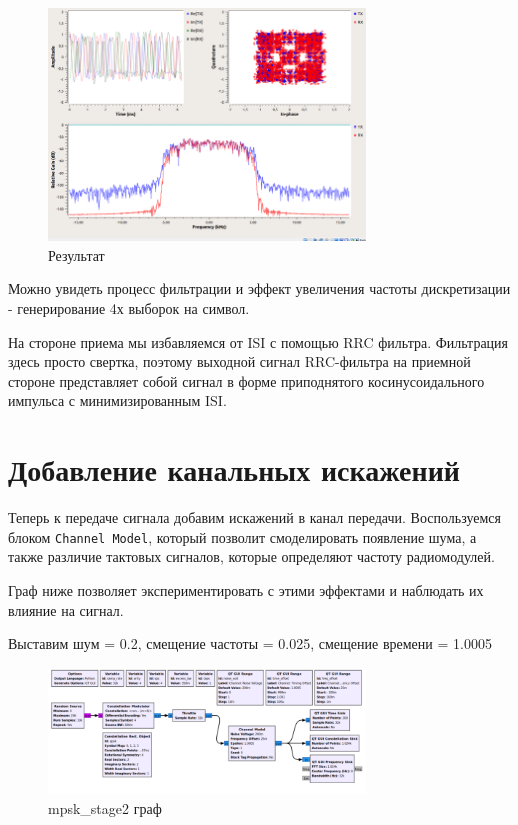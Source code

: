 \documentclass[a4paper,12pt]{article}
\begin{document}
	\begin{figure}[H]
		\centering
		\includegraphics[width=0.75\textwidth]{1_4.png}
		\caption{Результат}
		\label{fig:1.4}
	\end{figure}
	
	Можно увидеть процесс фильтрации и эффект увеличения частоты дискретизации - генерирование 4х выборок на символ.
	
	На стороне приема мы избавляемся от ISI с помощью RRC фильтра. Фильтрация здесь просто свертка, поэтому выходной сигнал RRC-фильтра на приемной стороне представляет собой сигнал в форме приподнятого косинусоидального импульса с минимизированным ISI. 
	
	\newpage
	
	\section{Добавление канальных искажений}
	
	Теперь к передаче сигнала добавим искажений в канал передачи. Воспользуемся блоком \texttt{Channel Model}, который позволит смоделировать появление шума, а также различие тактовых сигналов, которые определяют частоту радиомодулей.
	
	Граф ниже позволяет экспериментировать с этими эффектами и наблюдать их влияние на сигнал.
	
	Выставим шум = 0.2, смещение частоты = 0.025, смещение времени = 1.0005
	
	\begin{figure}[H]
		\centering
		\includegraphics[width=0.75\textwidth]{2_1.png}
		\caption{mpsk\_stage2 граф}
		\label{fig:2.1}
	\end{figure}
	
\end{document}
